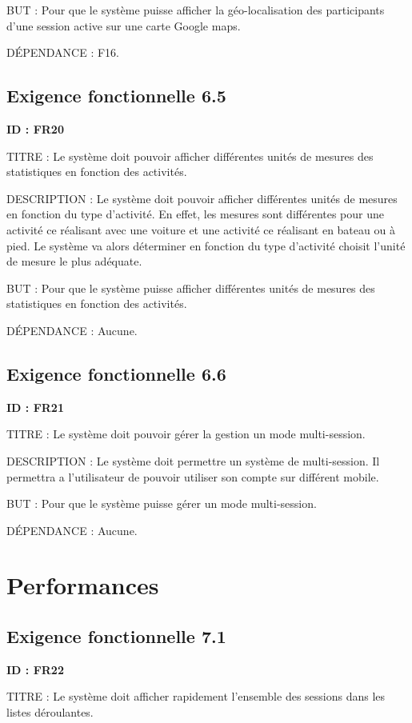 \documentclass[titlepage, 12pt]{report}
\begin{document}
BUT : Pour que le système puisse afficher la géo-localisation des participants d'une session active sur une carte Google maps.

DÉPENDANCE : F16.

\subsection{Exigence fonctionnelle 6.5}

\textbf{ID : FR20}

TITRE : Le système doit pouvoir afficher différentes unités de mesures des statistiques en fonction des activités.

DESCRIPTION : Le système doit pouvoir afficher différentes unités de mesures en fonction du type d'activité. En effet, les mesures sont différentes pour une activité ce réalisant avec une voiture et une activité ce réalisant en bateau ou à pied. Le système va alors déterminer en fonction du type d'activité choisit l'unité de mesure le plus adéquate.

BUT : Pour que le système puisse afficher différentes unités de mesures des statistiques en fonction des activités.

DÉPENDANCE : Aucune.

\subsection{Exigence fonctionnelle 6.6}

\textbf{ID : FR21}

TITRE : Le système doit pouvoir gérer la gestion un mode multi-session.

DESCRIPTION : Le système doit permettre un système de multi-session. Il permettra a l'utilisateur de pouvoir utiliser son compte sur différent mobile.

BUT : Pour que le système puisse gérer un mode multi-session.

DÉPENDANCE : Aucune.

\section{Performances}

\subsection{Exigence fonctionnelle 7.1}

\textbf{ID : FR22}

TITRE : Le système doit afficher rapidement l'ensemble des sessions dans les listes déroulantes.
\end{document}
